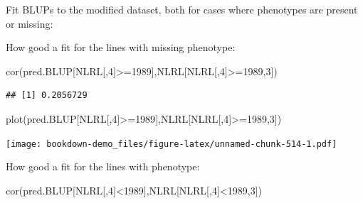 \documentclass[
]{book}
\newenvironment{Shaded}{\begin{snugshade}}{\end{snugshade}}
\newcommand{\AttributeTok}[1]{\textcolor[rgb]{0.77,0.63,0.00}{#1}}
\newcommand{\DecValTok}[1]{\textcolor[rgb]{0.00,0.00,0.81}{#1}}
\newcommand{\FunctionTok}[1]{\textcolor[rgb]{0.00,0.00,0.00}{#1}}
\newcommand{\NormalTok}[1]{#1}
\newcommand{\OtherTok}[1]{\textcolor[rgb]{0.56,0.35,0.01}{#1}}
\newcommand{\SpecialCharTok}[1]{\textcolor[rgb]{0.00,0.00,0.00}{#1}}
\begin{document}
Fit BLUPs to the modified dataset, both for cases where phenotypes are present or missing:

\begin{Shaded}
\end{Shaded}

How good a fit for the lines with missing phenotype:

\begin{Shaded}
\begin{Highlighting}[]
\FunctionTok{cor}\NormalTok{(pred.BLUP[NLRL[,}\DecValTok{4}\NormalTok{]}\SpecialCharTok{\textgreater{}=}\DecValTok{1989}\NormalTok{],NLRL[NLRL[,}\DecValTok{4}\NormalTok{]}\SpecialCharTok{\textgreater{}=}\DecValTok{1989}\NormalTok{,}\DecValTok{3}\NormalTok{])}
\end{Highlighting}
\end{Shaded}

\begin{verbatim}
## [1] 0.2056729
\end{verbatim}

\begin{Shaded}
\begin{Highlighting}[]
\FunctionTok{plot}\NormalTok{(pred.BLUP[NLRL[,}\DecValTok{4}\NormalTok{]}\SpecialCharTok{\textgreater{}=}\DecValTok{1989}\NormalTok{],NLRL[NLRL[,}\DecValTok{4}\NormalTok{]}\SpecialCharTok{\textgreater{}=}\DecValTok{1989}\NormalTok{,}\DecValTok{3}\NormalTok{])}
\end{Highlighting}
\end{Shaded}

\texttt{[image: bookdown-demo\_files/figure-latex/unnamed-chunk-514-1.pdf]}

How good a fit for the lines with phenotype:

\begin{Shaded}
\begin{Highlighting}[]
\FunctionTok{cor}\NormalTok{(pred.BLUP[NLRL[,}\DecValTok{4}\NormalTok{]}\SpecialCharTok{\textless{}}\DecValTok{1989}\NormalTok{],NLRL[NLRL[,}\DecValTok{4}\NormalTok{]}\SpecialCharTok{\textless{}}\DecValTok{1989}\NormalTok{,}\DecValTok{3}\NormalTok{])}
\end{Highlighting}
\end{Shaded}
\end{document}
